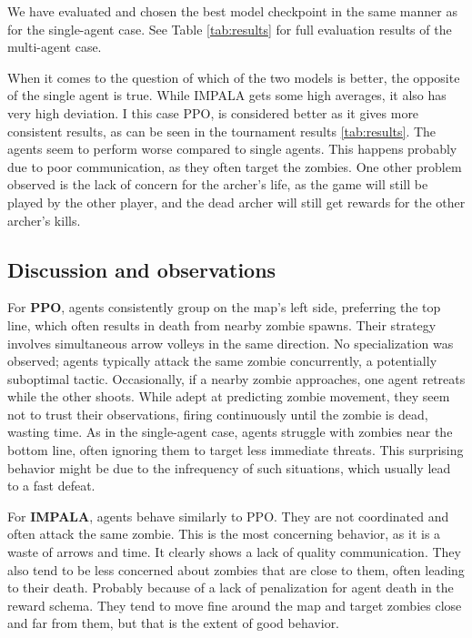 \documentclass[12pt,a4paper, onecolumn]{exam}
\begin{document}
We have evaluated and chosen the best model checkpoint in the same manner as for the single-agent case.
See Table \ref{tab:results} for full evaluation results of the multi-agent case.

When it comes to the question of which of the two models is better, the opposite of the single agent is true. While IMPALA gets some high averages,
it also has very high deviation. I this case PPO, is considered better as it gives more consistent results, as can be seen in the tournament results \ref{tab:results}.
The agents seem to perform worse compared to single agents. This happens probably due to poor communication, as they often target the zombies.
One other problem observed is the lack of concern for the archer's life, as the game will still be played by the other player, and
the dead archer will still get rewards for the other archer's kills.

\subsection{Discussion and observations}

For \textbf{PPO}, agents consistently group on the map's left side, preferring the top line, which often results in
death from nearby zombie spawns. Their strategy involves simultaneous arrow volleys in the same direction.
No specialization was observed; agents typically attack the same zombie concurrently, a potentially suboptimal tactic.
Occasionally, if a nearby zombie approaches, one agent retreats while the other shoots. While adept at predicting
zombie movement, they seem not to trust their observations, firing continuously until the zombie is dead, wasting
time. As in the single-agent case, agents struggle with zombies near the bottom line, often ignoring them to
target less immediate threats. This surprising behavior might be due to the infrequency of such situations,
which usually lead to a fast defeat.

For \textbf{IMPALA}, agents behave similarly to PPO. They are not coordinated and often attack the same zombie.
This is the most concerning behavior, as it is a waste of arrows and time. It clearly shows a lack of quality communication.
They also tend to be less concerned about zombies that are close to them, often leading to their death.
Probably because of a lack of penalization for agent death in the reward schema.
They tend to move fine around the map and target zombies close and far from them, but that is the extent of good behavior.
\end{document}
